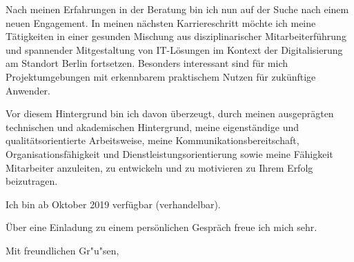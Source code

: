 \documentclass[10pt,a4paper]{dinbrief}
\begin{document}
\begin{letter}
Nach meinen Erfahrungen in der Beratung bin ich nun auf der Suche nach einem neuen Engagement. In meinen nächsten Karriereschritt möchte ich meine Tätigkeiten in einer gesunden Mischung aus disziplinarischer Mitarbeiterführung und spannender Mitgestaltung von IT-Lösungen im Kontext der Digitalisierung am Standort Berlin fortsetzen. Besonders interessant sind für mich Projektumgebungen mit erkennbarem praktischem Nutzen für zukünftige Anwender.

Vor diesem Hintergrund bin ich davon überzeugt, durch meinen ausgeprägten technischen und akademischen Hintergrund, meine eigenständige und qualitätsorientierte Arbeitsweise, meine Kommunikationsbereitschaft, Organisationsfähigkeit und Dienstleistungsorientierung sowie meine Fähigkeit Mitarbeiter anzuleiten, zu entwickeln und zu motivieren zu Ihrem Erfolg beizutragen.

Ich bin ab Oktober 2019 verfügbar (verhandelbar).

Über eine Einladung zu einem persönlichen Gespräch freue ich mich sehr.


\closing{Mit freundlichen Gr"u"sen,}
\end{letter}
\end{document}
